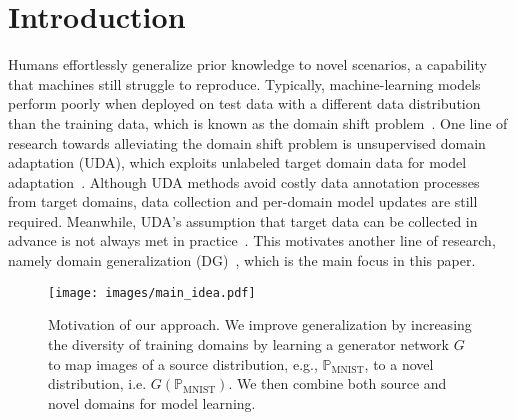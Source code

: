 \documentclass[runningheads]{llncs}
\begin{document}
\section{Introduction} \label{sec:intro}
Humans effortlessly generalize prior knowledge to novel scenarios, a capability that machines still struggle to reproduce. Typically, machine-learning models perform poorly when deployed on test data with a different data distribution than the training data, which is known as the domain shift problem~\cite{zhou2021domain,moreno2012unifying}. One line of research towards alleviating the domain shift problem is unsupervised domain adaptation (UDA), which exploits unlabeled target domain data for model adaptation~\cite{ganin2015unsupervised,long2015learning,hoffman2018cycada,Peng_2019_ICCV,Xu_2019_ICCV,Saito_2019_ICCV}. Although UDA methods avoid costly data annotation processes from target domains, data collection and per-domain model updates are still required. Meanwhile, UDA's assumption that target data can be collected in advance is not always met in practice~\cite{muandet2013domain,dou2019domain}. This motivates another line of research, namely domain generalization (DG)~\cite{zhou2021domain,muandet2013domain,ghifary2015domain,ghifary2017scatter,balaji2018metareg,cvpr19JiGen,dou2019domain}, which is the main focus in this paper.

\begin{figure}[t]
    \centering
    \texttt{[image: images/main\_idea.pdf]}
    \caption{Motivation of our approach. We improve generalization by increasing the diversity of training domains by learning a generator network $G$ to map images of a source distribution, e.g., $\mathbb{P}_{\text{MNIST}}$, to a novel distribution, i.e. $G(\mathbb{P}_{\text{MNIST}})$. We then combine both source and novel domains for model learning.}
    \label{fig:main_idea}
\end{figure}
\end{document}
